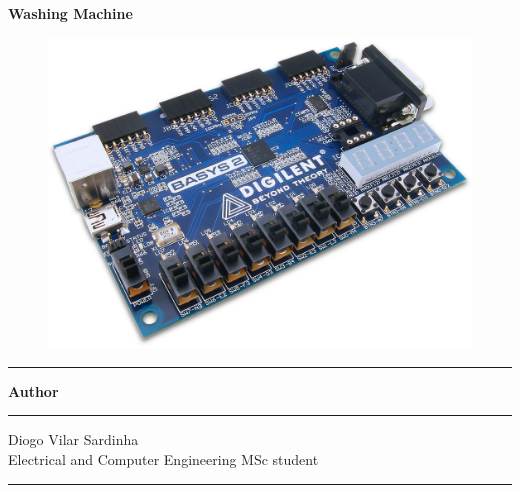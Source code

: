 \begin{titlepage}
	\begin{center}
				
		{\huge \bfseries Washing Machine}\\[2cm]
		
		\begin{figure}[H]
			\centering
			\includegraphics[width=1\textwidth]{img/basys2}
		\end{figure}
	
		\begin{minipage}{\textwidth}
			\begin{center} \large
				{
					\begin{center}
						\rule{\linewidth}{0.5mm}
						\textbf{Author}
						\rule{\linewidth}{0.5mm}
					\end{center}
				}{			
					\begin{center}
						\large Diogo Vilar Sardinha	\\
						\large	Electrical and Computer Engineering MSc student \\
						\rule{\linewidth}{0.5mm}
					\end{center}
				}
			\end{center}
		\end{minipage} \\[1cm]
	
		\vspace{\fill} 
		\begin{minipage}[b]{\textwidth}
			\centering
			\large   
		\end{minipage}
		
		\pagebreak
		
	\end{center}
\end{titlepage}